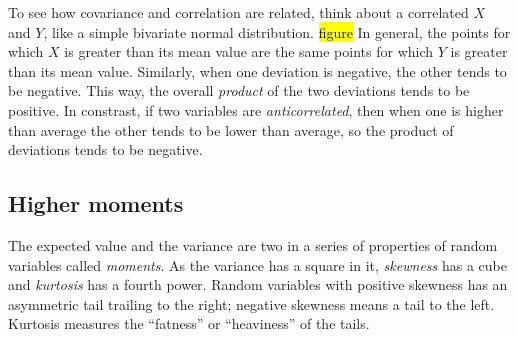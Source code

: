 
To see how covariance and correlation are related, think about a correlated
$X$ and $Y$, like a simple bivariate normal distribution. \hl{figure} In
general, the points for which $X$ is greater than its mean value are the same
points for which $Y$ is greater than its mean value. Similarly, when one
deviation is negative, the other tends to be negative. This way, the overall
\emph{product} of the two deviations tends to be positive. In constrast, if
two variables are \emph{anticorrelated}, then when one is higher than average
the other tends to be lower than average, so the product of deviations tends
to be negative.

\subsection{Higher moments}

The expected value and the variance are two in a series of properties of
random variables called \emph{moments}. As the variance has a square in it,
\emph{skewness} has a cube and \emph{kurtosis} has a fourth power. Random
variables with positive skewness has an asymmetric tail trailing to the right;
negative skewness means a tail to the left. Kurtosis measures the ``fatness''
or ``heaviness'' of the tails.
